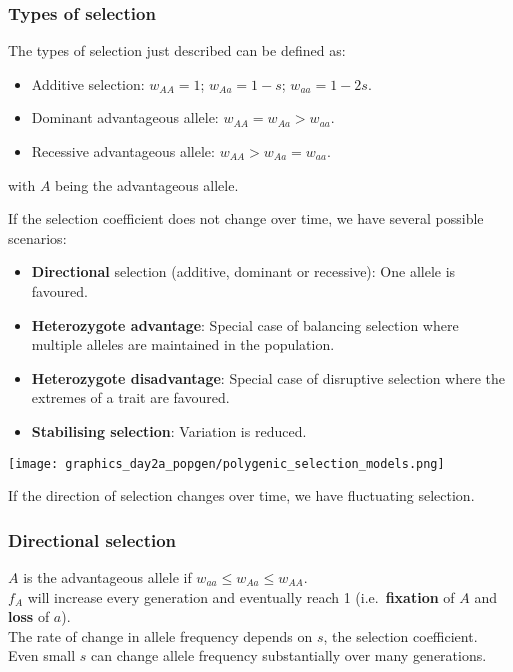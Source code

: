 \documentclass{beamer}
\newcommand{\1}{\ensuremath{\mathbf{1}}}
\begin{document}
%
%
%
\begin{frame}\frametitle{Types of selection}
	The types of selection just described can be defined as:
	\begin{itemize}
		\item Additive selection: $w_{AA} = 1$; $w_{Aa} = 1-s$; $w_{aa} = 1-2s$.
		\item Dominant advantageous allele: $w_{AA} = w_{Aa} > w_{aa}$.
		\item Recessive advantageous allele: $w_{AA} > w_{Aa} = w_{aa}$.
	\end{itemize}
	with $A$ being the advantageous allele.
\end{frame}
%
%
%
\begin{frame}
	If the selection coefficient does not change over time, we have several possible scenarios:
	\begin{itemize}
		\item \textbf{Directional} selection (additive, dominant or recessive): One allele is favoured.
		\item \textbf{Heterozygote advantage}: Special case of balancing selection where multiple alleles are maintained in the population.
		\item \textbf{Heterozygote disadvantage}: Special case of disruptive selection where the extremes of a trait are favoured.
		\item \textbf{Stabilising selection}: Variation is reduced.
	\end{itemize}
	\begin{center}
		\texttt{[image: graphics\_day2a\_popgen/polygenic\_selection\_models.png]}
	\end{center}
	{\footnotesize If the direction of selection changes over time, we have fluctuating selection.}
\end{frame}
%
%
%
\begin{frame}\frametitle{Directional selection}
	$A$ is the advantageous allele if $w_{aa} \leq w_{Aa} \leq w_{AA}$.\\[2ex]
	$f_A$ will increase every generation and eventually reach 1 (i.e.\ \textbf{fixation} of $A$ and \textbf{loss} of $a$).\\[2ex]
	The rate of change in allele frequency depends on $s$, the selection coefficient.\\
	Even small $s$ can change allele frequency substantially over many generations.
\end{frame}
\end{document}
